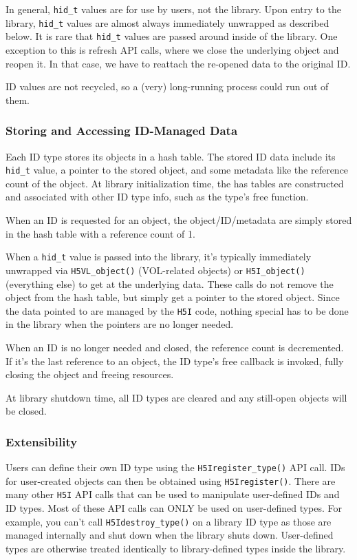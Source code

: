 In general, \texttt{hid\_t} values are for use by users, not the library. Upon entry to the library, \texttt{hid\_t} values are almost always immediately unwrapped as described below. It is rare that \texttt{hid\_t} values are passed around inside of the library. One exception to this is refresh API calls, where we close the underlying object and reopen it. In that case, we have to reattach the re-opened data to the original ID.

ID values are not recycled, so a (very) long-running process could run out of them.

\subsubsection{Storing and Accessing ID-Managed Data}

Each ID type stores its objects in a hash table. The stored ID data include its \texttt{hid\_t} value, a pointer to the stored object, and some metadata like the reference count of the object. At library initialization time, the has tables are constructed and associated with other ID type info, such as the type's free function.

When an ID is requested for an object, the object/ID/metadata are simply stored in the hash table with a reference count of 1.

When a \texttt{hid\_t} value is passed into the library, it's typically immediately unwrapped via \texttt{H5VL\_object()} (VOL-related objects) or \texttt{H5I\_object()} (everything else) to get at the underlying data. These calls do not remove the object from the hash table, but simply get a pointer to the stored object. Since the data pointed to are managed by the \texttt{H5I} code, nothing special has to be done in the library when the pointers are no longer needed.

When an ID is no longer needed and closed, the reference count is decremented. If it's the last reference to an object, the ID type's free callback is invoked, fully closing the object and freeing resources.

At library shutdown time, all ID types are cleared and any still-open objects will be closed.


\subsubsection{Extensibility}

Users can define their own ID type using the \texttt{H5Iregister\_type()} API call. IDs for user-created objects can then be obtained using \texttt{H5Iregister()}. There are many other \texttt{H5I} API calls that can be used to manipulate user-defined IDs and ID types. Most of these API calls can ONLY be used on user-defined types. For example, you can't call \texttt{H5Idestroy\_type()} on a library ID type as those are managed internally and shut down when the library shuts down. User-defined types are otherwise treated identically to library-defined types inside the library.

